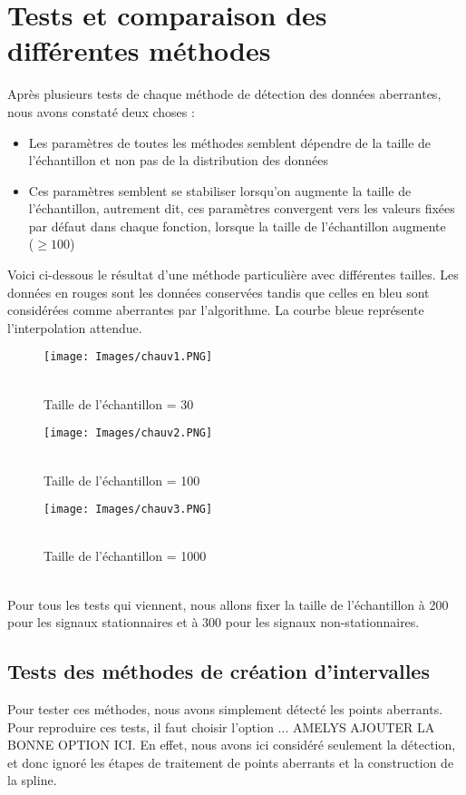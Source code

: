 \documentclass[a4paper,12pt]{article} %
\begin{document}
	\section{Tests et comparaison des différentes méthodes}
        Après plusieurs tests de chaque méthode de détection des données aberrantes, nous avons constaté deux choses :
        \begin{itemize}
        \item Les paramètres de toutes les méthodes semblent dépendre de la taille de l’échantillon et non pas de la distribution des données 
        \item Ces paramètres semblent se stabiliser lorsqu’on augmente la taille de l’échantillon, autrement dit, ces paramètres convergent vers les valeurs fixées par défaut dans chaque fonction, lorsque la taille de l’échantillon augmente \\($\ge 100 $)
        \end{itemize}
        Voici ci-dessous le résultat d'une méthode particulière avec différentes tailles. Les données en rouges sont les données conservées tandis que celles en bleu sont considérées comme aberrantes par l'algorithme. La courbe bleue représente l'interpolation attendue.
        \begin{figure}[H] %
        \texttt{[image: Images/chauv1.PNG]} %
        \caption{\\Taille de l’échantillon = 30} %
        \label{m15} %
        \endminipage
        \texttt{[image: Images/chauv2.PNG]}  
        \caption{\\Taille de l’échantillon = 100}
        \label{m5}
        \endminipage
        \texttt{[image: Images/chauv3.PNG]}  
        \caption{\\Taille de l’échantillon = 1000}
        \label{m35}
        \endminipage
        
        \end{figure}
        \\
        Pour tous les tests qui viennent, nous allons fixer la taille de l’échantillon à 200 pour les signaux stationnaires et à 300 pour les signaux non-stationnaires.
        
        
        \subsection{Tests des méthodes de création d'intervalles}
        Pour tester ces méthodes, nous avons simplement détecté les points aberrants. Pour reproduire ces tests, il faut choisir l'option ... AMELYS AJOUTER LA BONNE OPTION ICI. En effet, nous avons ici considéré seulement la détection, et donc ignoré les étapes de traitement de points aberrants et la construction de la spline.
        
\end{document}
